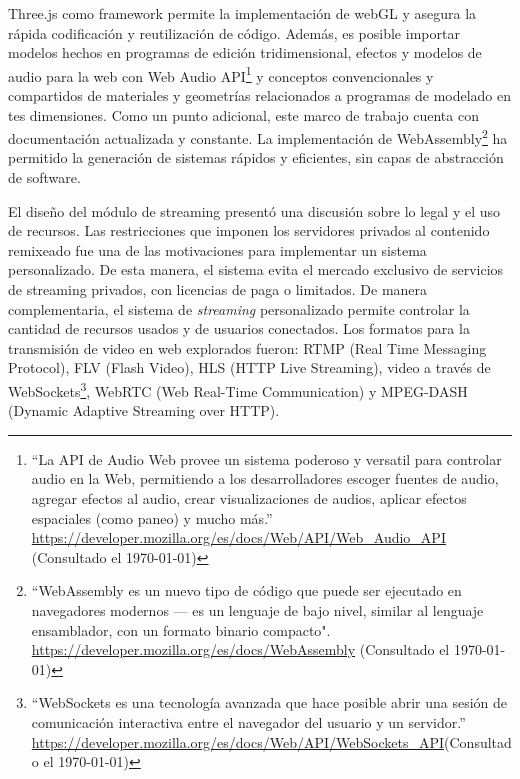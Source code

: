 Three.js como framework permite la implementación de webGL y asegura la rápida codificación y reutilización de código. Además, es posible importar modelos hechos en programas de edición tridimensional, efectos y modelos de audio para la web con Web Audio API\footnote{``La API de Audio Web provee un sistema poderoso y versatil para controlar audio en la Web, permitiendo a los desarrolladores escoger fuentes de audio, agregar efectos al audio, crear visualizaciones de audios, aplicar efectos espaciales (como paneo) y mucho más.'' \url{https://developer.mozilla.org/es/docs/Web/API/Web_Audio_API} (Consultado el \today)} y conceptos convencionales y compartidos de materiales y geometrías relacionados a programas de modelado en tes dimensiones. Como un punto adicional, este marco de trabajo cuenta con documentación actualizada y constante. La implementación de WebAssembly\footnote{``WebAssembly es un nuevo tipo de código que puede ser ejecutado en navegadores modernos — es un lenguaje de bajo nivel, similar al lenguaje ensamblador, con un formato binario compacto". \url{https://developer.mozilla.org/es/docs/WebAssembly} (Consultado el \today) } ha permitido la generación de sistemas rápidos y eficientes, sin capas de abstracción de software.

El diseño del módulo de streaming presentó una discusión sobre lo legal y el uso de recursos. Las restricciones que imponen los servidores privados al contenido remixeado fue una de las motivaciones para implementar un sistema personalizado. De esta manera, el sistema evita el mercado exclusivo de servicios de streaming privados, con licencias de paga o limitados. De manera complementaria, el sistema de \textit{streaming} personalizado permite controlar la cantidad de recursos usados y  de usuarios conectados. Los formatos para la transmisión de video en web explorados fueron: RTMP (Real Time Messaging Protocol), FLV (Flash Video), HLS (HTTP Live Streaming), video a través de WebSockets\footnote{``WebSockets es una tecnología avanzada que hace posible abrir una sesión de comunicación interactiva entre el navegador del usuario y un servidor.'' \url{https://developer.mozilla.org/es/docs/Web/API/WebSockets_API}(Consultado el \today)}, WebRTC (Web Real-Time Communication) y MPEG-DASH (Dynamic Adaptive Streaming over HTTP).

